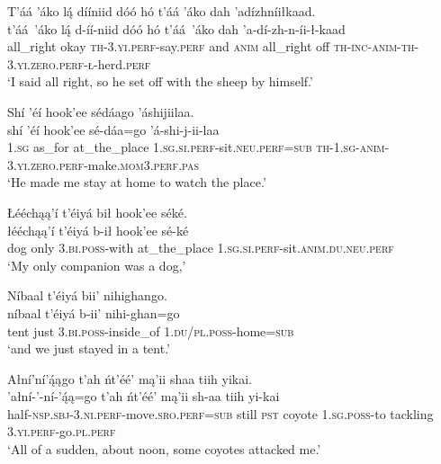 \newpage
\ea\label{ex:text6-14-5}
T’áá ’áko lą́ dííniid dóó hó t’áá ’áko dah ’adízhníiłkaad.\\
\gll t’áá~{’áko}	lą́	d-íí-niid	dóó	hó	t’áá~{’áko}	dah	’a-dí-zh-n-íi-ł-kaad\\
     all\_right	okay	\textsc{th}-3.\textsc{yi}.\textsc{perf}-say.\textsc{perf}	and	\textsc{anim}	all\_right	off	\textsc{th}-\textsc{inc}-\textsc{anim}-\textsc{th}-3.\textsc{yi}.\textsc{zero}.\textsc{perf}-\textsc{ł}-herd.\textsc{perf}\\
\glt `I said all right, so he set off with the sheep by himself.'
\z

\ea\label{ex:text6-14-6}
Shí ’éí hook’ee sédáago ’áshijiilaa.\\
\gll shí	’éí	hook’ee	sé-dáa=go	’á-shi-j-ii-laa\\
     1.\textsc{sg}	as\_for	at\_the\_place	1.\textsc{sg}.\textsc{si}.\textsc{perf}-sit.\textsc{neu}.\textsc{perf}=\textsc{sub}	\textsc{th}-1.\textsc{sg}-\textsc{anim}-3.\textsc{yi}.\textsc{zero}.\textsc{perf}-make.\textsc{mom}3.\textsc{perf}.\textsc{pas}\\
\glt `He made me stay at home to watch the place.'
\z

\ea\label{ex:text6-14-7}
Łééchąą’í t’éiyá bił hook’ee séké.\\
\gll łééchąą’í	t’éiyá	b-ił	hook’ee	sé-ké\\
     dog	only	3.\textsc{bi}.\textsc{poss}-with	at\_the\_place	1.\textsc{sg}.\textsc{si}.\textsc{perf}-sit.\textsc{anim}.\textsc{du}.\textsc{neu}.\textsc{perf}\\
\glt `My only companion was a dog,'
\z

\ea\label{ex:text6-14-8}
Níbaal t’éiyá bii’ nihighango.\\
\gll níbaal	t’éiyá	b-ii’	nihi-ghan=go\\
     tent	just	3.\textsc{bi}.\textsc{poss}-inside\_of	1.\textsc{du}/\textsc{pl}.\textsc{poss}-home=\textsc{sub}\\
\glt `and we just stayed in a tent.'
\z

\ea\label{ex:text6-15-1}
Ałní’ní’ą́ągo t’ah ńt’éé’ mą’ii shaa tiih yikai.\\
\gll ’ałní-’-ní-’ą́ą=go	t’ah	ńt’éé’	mą’ii	sh-aa	tiih	yi-kai\\
     half-\textsc{nsp}.\textsc{sbj}-3.\textsc{ni}.\textsc{perf}-move.\textsc{sro}.\textsc{perf}=\textsc{sub}	still	\textsc{pst}	coyote	1.\textsc{sg}.\textsc{poss}-to	tackling	3.\textsc{yi}.\textsc{perf}-go.\textsc{pl}.\textsc{perf}\\
\glt `All of a sudden, about noon, some coyotes attacked me.'
\z


